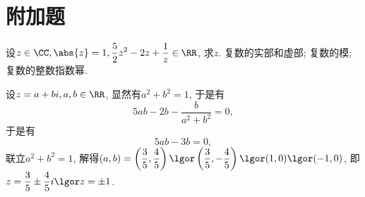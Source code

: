 \documentclass[8pt]{article}
\begin{document}
	\section{附加题}
		\begin{easonbigproblem}
			设\(z \in \CC, \abs{z} = 1, \displaystyle \frac{5}{2} z^2 - 2z + \frac{1}{z} \in \RR\), 求\(z\).
			\subbigproblem
			 复数的实部和虚部; 复数的模; 复数的整数指数幂.

			设\(z = a + bi, a, b \in \RR\), 显然有\(a^2 + b^2 = 1\), 于是有
			\begin{displaymath}
				5ab - 2b - \frac{b}{a^2 + b^2} = 0,
			\end{displaymath}
			于是有
			\begin{displaymath}
				5ab - 3b = 0,
			\end{displaymath}
			联立\(a^2 + b^2 = 1\), 解得\(\displaystyle (a, b) = \left(\frac{3}{5}, \frac{4}{5}\right) \lgor \left(\frac{3}{5}, -\frac{4}{5}\right) \lgor (1, 0) \lgor (-1, 0)\), 即\(z = \displaystyle \frac{3}{5} \pm \frac{4}{5} i \lgor z = \pm 1\).
		\end{easonbigproblem}

	\newpage
	
	
	
\end{document}
